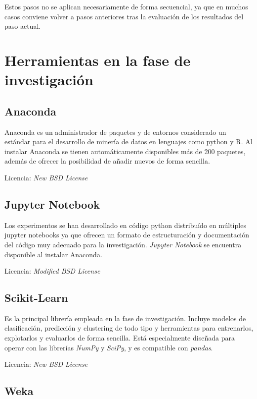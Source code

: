 Estos pasos no se aplican necesariamente de forma secuencial, ya que en muchos casos conviene volver a pasos anteriores tras la evaluación de los resultados del paso actual. 

\section{Herramientas en la fase de investigación}

\subsection{Anaconda}

Anaconda es un administrador de paquetes y de entornos considerado un estándar para el desarrollo de minería de datos en lenguajes como python y R. Al instalar Anaconda se tienen automáticamente disponibles más de 200 paquetes, además de ofrecer la posibilidad de añadir nuevos de forma sencilla. 

Licencia: \textit{New BSD License}

\subsection{Jupyter Notebook}

Los experimentos se han desarrollado en código python distribuído en múltiples jupyter notebooks ya que ofrecen un formato de estructuración y documentación del código muy adecuado para la investigación. \textit{Jupyter Notebook} se encuentra disponible al instalar Anaconda. 

Licencia: \textit{Modified BSD License}


\subsection{Scikit-Learn}

Es la principal librería empleada en la fase de investigación. Incluye modelos de clasificación, predicción y clustering de todo tipo y herramientas para entrenarlos, explotarlos y evaluarlos de forma sencilla. Está especialmente diseñada para operar con las librerías \textit{NumPy} y \textit{SciPy}, y es compatible con \textit{pandas}.

Licencia: \textit{New BSD License } 

\subsection{Weka}

